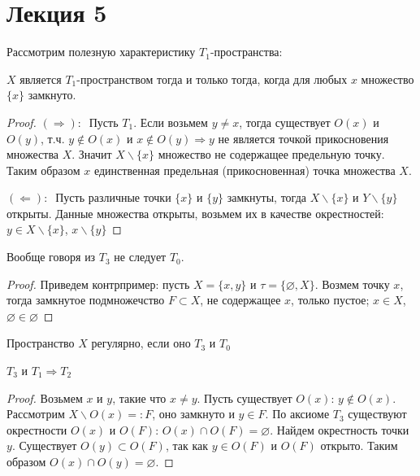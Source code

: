 \section{Лекция 5}


Рассмотрим полезную характеристику $T_1$-пространства: 

\begin{statement}
    $X$ является $T_1$-пространством тогда и только тогда, когда для любых $x$ множество $\{x\}$ замкнуто.      
\end{statement}
\begin{proof}
    $(\Rightarrow):\ $ Пусть $T_1$. Если возьмем $y \neq x$, тогда существует $O(x)$ и $O(y)$, т.ч. $y \not\in O(x)$ и $x \not\in O(y) \Longrightarrow y$ не является точкой прикосновения множества $X$. Значит $X\backslash \{x\}$ множество не содержащее предельную точку. Таким образом $x$ единственная предельная (прикосновенная) точка множества $X$.

    $(\Leftarrow):\ $ Пусть различные точки $\{x\}$ и $\{y\}$ замкнуты, тогда $X\backslash \{x\}$ и $Y\backslash \{y\}$ открыты. Данные множества открыты, возьмем их в качестве окрестностей: $y \in X\backslash\{x\}$, $x \backslash\{y\}$ 
\end{proof}

\begin{statement}
    Вообще говоря из $T_3$ не следует $T_0$.  
\end{statement}
\begin{proof}
    Приведем контрпример: пусть $X = \{x, y\}$ и $\tau = \{\varnothing, X\}$. Возмем точку $x$, тогда замкнутое подмножечство $F \subset X$, не содержащее $x$, только пустое; $x \in X$, $\varnothing \in \varnothing$  
\end{proof}

\begin{definition}
    Пространство $X$ регулярно, если оно $T_3$ и $T_0$   
\end{definition}

\begin{statement}
    $T_3$ и $T_1 \Rightarrow T_2$
\end{statement}
\begin{proof}
    Возьмем $x$ и $y$, такие что $x \neq y$. Пусть существует $O(x)$: $y \not\in O(x)$. Рассмотрим $X\backslash O(x) =: F$, оно замкнуто и $y \in F$. По аксиоме $T_3$ существуют окрестности $O(x)$ и $O(F)$: $O(x) \cap O(F) = \varnothing$. Найдем окрестность точки $y$. Существует $O(y) \subset O(F)$, так как $y \in O(F)$ и $O(F)$ открыто. Таким образом $O(x) \cap O(y) = \varnothing$.
\end{proof}

